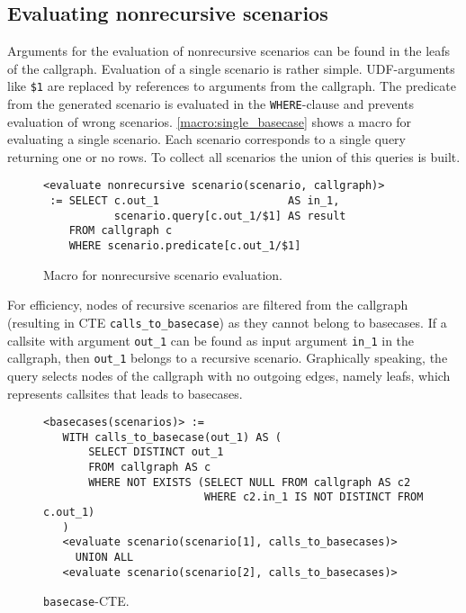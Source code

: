 \subsection{Evaluating nonrecursive scenarios}
Arguments for the evaluation of nonrecursive scenarios can be found in the leafs of the callgraph.
Evaluation of a single scenario is rather simple. UDF-arguments like \texttt{\$1} are replaced by references to arguments from the callgraph. The predicate from the generated scenario is evaluated in the \texttt{WHERE}-clause and prevents evaluation of wrong scenarios. \autoref{macro:single_basecase} shows a macro for evaluating a single scenario. Each scenario corresponds to a single query returning one or no rows. To collect all scenarios the union of this queries is built.
\begin{figure}[h!]
    \centering
    \begin{verbatim}
<evaluate nonrecursive scenario(scenario, callgraph)>
 := SELECT c.out_1                    AS in_1, 
           scenario.query[c.out_1/$1] AS result
    FROM callgraph c
    WHERE scenario.predicate[c.out_1/$1]
    \end{verbatim}
    \caption{Macro for nonrecursive scenario evaluation.}
    \label{macro:single_basecase}
\end{figure}

For efficiency, nodes of recursive scenarios are filtered from the callgraph (resulting in CTE \texttt{calls\_to\_basecase}) as they cannot belong to basecases. If a callsite with argument \texttt{out\_1} can be found as input argument \texttt{in\_1} in the callgraph, then \texttt{out\_1} belongs to a recursive scenario. Graphically speaking, the query selects nodes of the callgraph with no outgoing edges, namely leafs, which represents callsites that leads to basecases.

\begin{figure}[h!]
    \centering
    \begin{verbatim}
<basecases(scenarios)> := 
   WITH calls_to_basecase(out_1) AS (
       SELECT DISTINCT out_1 
       FROM callgraph AS c
       WHERE NOT EXISTS (SELECT NULL FROM callgraph AS c2
                         WHERE c2.in_1 IS NOT DISTINCT FROM c.out_1)
   )
   <evaluate scenario(scenario[1], calls_to_basecases)>
     UNION ALL 
   <evaluate scenario(scenario[2], calls_to_basecases)>
    \end{verbatim}
    \caption{\texttt{basecase}-CTE.}
    \label{macro:basecases}
\end{figure}

